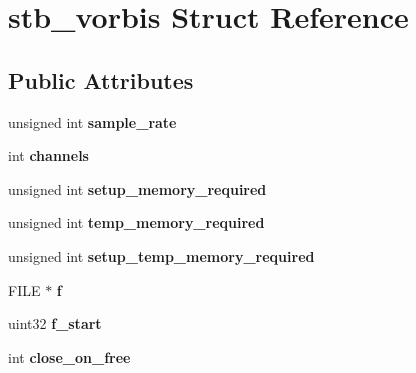 \hypertarget{structstb__vorbis}{}\section{stb\+\_\+vorbis Struct Reference}
\label{structstb__vorbis}
\subsection*{Public Attributes}
\begin{DoxyCompactItemize}
\item 
unsigned int {\bfseries sample\+\_\+rate}\hypertarget{structstb__vorbis_aea5df8cb01245c5a3658f2b48cd74ad1}{}\label{structstb__vorbis_aea5df8cb01245c5a3658f2b48cd74ad1}

\item 
int {\bfseries channels}\hypertarget{structstb__vorbis_ad7f03b7568a58e7c92f3a867a1030df3}{}\label{structstb__vorbis_ad7f03b7568a58e7c92f3a867a1030df3}

\item 
unsigned int {\bfseries setup\+\_\+memory\+\_\+required}\hypertarget{structstb__vorbis_af6552029487a8eb38da473b0cc6a60c6}{}\label{structstb__vorbis_af6552029487a8eb38da473b0cc6a60c6}

\item 
unsigned int {\bfseries temp\+\_\+memory\+\_\+required}\hypertarget{structstb__vorbis_a8ed60a85b7e09e19b5eee4068cd983f1}{}\label{structstb__vorbis_a8ed60a85b7e09e19b5eee4068cd983f1}

\item 
unsigned int {\bfseries setup\+\_\+temp\+\_\+memory\+\_\+required}\hypertarget{structstb__vorbis_a52b6994c72625b043f9ae3fa0bc40893}{}\label{structstb__vorbis_a52b6994c72625b043f9ae3fa0bc40893}

\item 
F\+I\+LE $\ast$ {\bfseries f}\hypertarget{structstb__vorbis_ab345e7bff2cbf3c100593c0d684cb3e7}{}\label{structstb__vorbis_ab345e7bff2cbf3c100593c0d684cb3e7}

\item 
uint32 {\bfseries f\+\_\+start}\hypertarget{structstb__vorbis_ab03f15c21c2b01934afaee49ae319991}{}\label{structstb__vorbis_ab03f15c21c2b01934afaee49ae319991}

\item 
int {\bfseries close\+\_\+on\+\_\+free}\hypertarget{structstb__vorbis_af5bffde87c285ec4189ac54f12c15c95}{}\label{structstb__vorbis_af5bffde87c285ec4189ac54f12c15c95}


\end{DoxyCompactItemize}
